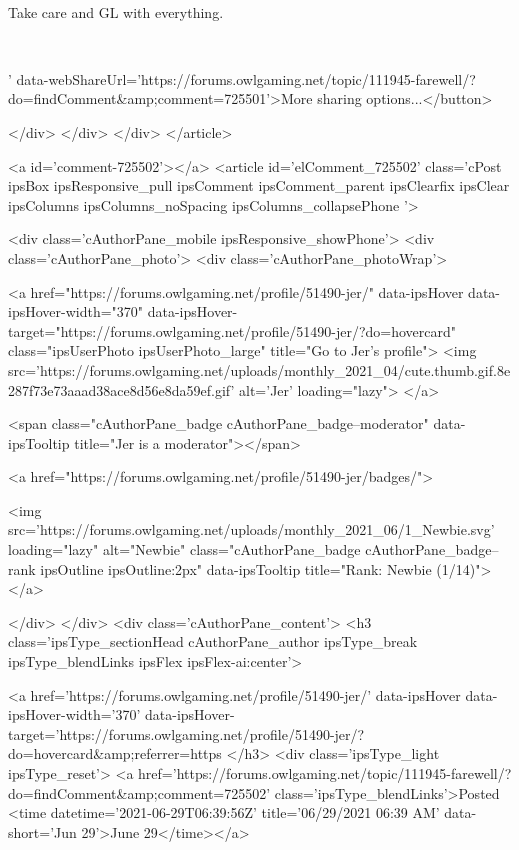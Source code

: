 	 
 


	Take care and GL with everything.
 


	 
 
' data-webShareUrl='https://forums.owlgaming.net/topic/111945-farewell/?do=findComment&amp;comment=725501'>More sharing options...</button>

	
</div>
</div>
	</div>
</article>
					
				
					
					
					



<a id='comment-725502'></a>
<article  id='elComment_725502' class='cPost ipsBox ipsResponsive_pull  ipsComment  ipsComment_parent ipsClearfix ipsClear ipsColumns ipsColumns_noSpacing ipsColumns_collapsePhone    '>
	

	

	<div class='cAuthorPane_mobile ipsResponsive_showPhone'>
		<div class='cAuthorPane_photo'>
			<div class='cAuthorPane_photoWrap'>
				


	<a href="https://forums.owlgaming.net/profile/51490-jer/" data-ipsHover data-ipsHover-width="370" data-ipsHover-target="https://forums.owlgaming.net/profile/51490-jer/?do=hovercard" class="ipsUserPhoto ipsUserPhoto_large" title="Go to Jer's profile">
		<img src='https://forums.owlgaming.net/uploads/monthly_2021_04/cute.thumb.gif.8e287f73e73aaad38ace8d56e8da59ef.gif' alt='Jer' loading="lazy">
	</a>

				
				<span class="cAuthorPane_badge cAuthorPane_badge--moderator" data-ipsTooltip title="Jer is a moderator"></span>
				
				
					<a href="https://forums.owlgaming.net/profile/51490-jer/badges/">
						
<img src='https://forums.owlgaming.net/uploads/monthly_2021_06/1_Newbie.svg' loading="lazy" alt="Newbie" class="cAuthorPane_badge cAuthorPane_badge--rank ipsOutline ipsOutline:2px" data-ipsTooltip title="Rank: Newbie (1/14)">
					</a>
				
			</div>
		</div>
		<div class='cAuthorPane_content'>
			<h3 class='ipsType_sectionHead cAuthorPane_author ipsType_break ipsType_blendLinks ipsFlex ipsFlex-ai:center'>
				


<a href='https://forums.owlgaming.net/profile/51490-jer/' data-ipsHover data-ipsHover-width='370' data-ipsHover-target='https://forums.owlgaming.net/profile/51490-jer/?do=hovercard&amp;referrer=https%
			</h3>
			<div class='ipsType_light ipsType_reset'>
				<a href='https://forums.owlgaming.net/topic/111945-farewell/?do=findComment&amp;comment=725502' class='ipsType_blendLinks'>Posted <time datetime='2021-06-29T06:39:56Z' title='06/29/2021 06:39  AM' data-short='Jun 29'>June 29</time></a>
				
